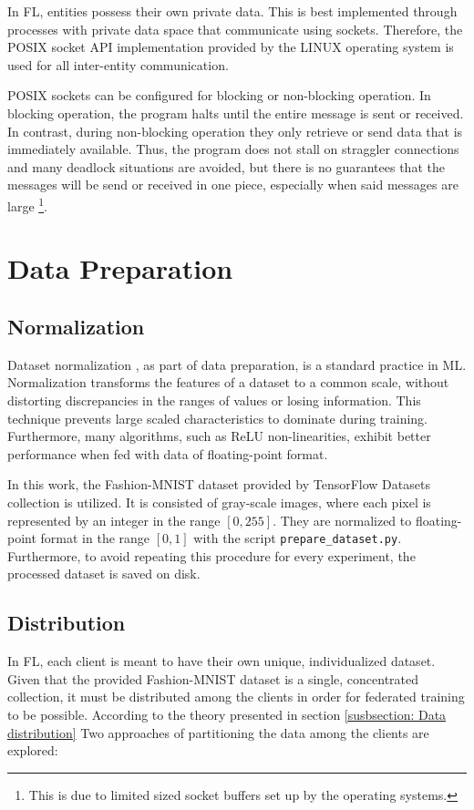 In FL, entities possess their own private data. This is best implemented through processes with private data space that communicate using sockets. Therefore, the POSIX socket API implementation provided by the LINUX operating system is used for all inter-entity communication. 

POSIX sockets can be configured for blocking or non-blocking operation. In blocking operation, the program halts until the entire message is sent or received. In contrast, during non-blocking operation they only retrieve or send data that is immediately available. Thus, the program does not stall on straggler connections and many deadlock situations are avoided, but there is no guarantees that the messages will be send or received in one piece, especially when said messages are large \footnote{This is due to limited sized socket buffers set up by the operating systems.}.

\section{Data Preparation}
\label{sec:data_prep}
\subsection{Normalization}
Dataset normalization \cite{dataset_norm}, as part of data preparation, is a standard practice in ML. Normalization transforms the features of a dataset to a common scale, without distorting discrepancies in the ranges of values or losing information. This technique prevents large scaled characteristics to dominate during training. Furthermore, many algorithms, such as ReLU non-linearities, exhibit better performance when fed with data of floating-point format.

In this work, the Fashion-MNIST dataset provided by TensorFlow Datasets \cite{TFDS} collection is utilized. It is consisted of gray-scale images, where each pixel is represented by an integer in the range \([0,255]\). They are normalized to floating-point format in the range \([0,1]\) with the script \texttt{prepare\_dataset.py}. Furthermore, to avoid repeating this procedure for every experiment, the processed dataset is saved on disk.

\subsection{Distribution}
In FL, each client is meant to have their own unique, individualized dataset. Given that the provided Fashion-MNIST dataset is a single, concentrated collection, it must be distributed among the clients in order for federated training to be possible. According to the theory presented in section \ref{susbsection: Data distribution} Two approaches of partitioning the data among the clients are explored:

